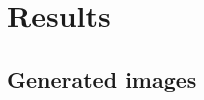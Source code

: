 \documentclass[twocolumn]{article}
\numberwithin{equation}{section}
\begin{document}

\section{Results}\label{sec:results}

\subsection{Generated images}




\end{document}
